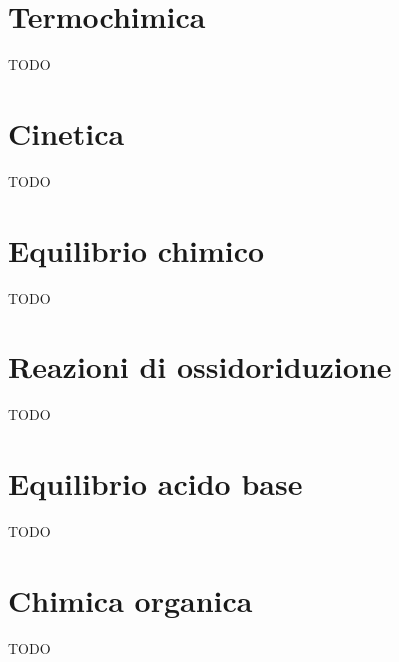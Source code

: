 \documentclass{article}
\begin{document}
\pagebreak

\section{Termochimica}
TODO
\pagebreak

\section{Cinetica}
TODO
\pagebreak

\section{Equilibrio chimico}
TODO
\pagebreak

\section{Reazioni di ossidoriduzione}
TODO
\pagebreak

\section{Equilibrio acido base}
TODO
\pagebreak

\section{Chimica organica}
TODO
\end{document}
